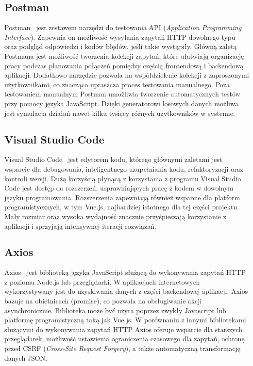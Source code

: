 \subsection{Postman}
Postman~\cite{postman} jest zestawem narzędzi do testowania API (\textit{Application Programming Interface}). Zapewnia on możliwość wysyłania zapytań HTTP dowolnego typu oraz podgląd odpowiedzi i kodów błędów, jeśli takie wystąpiły. Główną zaletą Postmana jest możliwość tworzenia kolekcji zapytań, które ułatwiają organizację pracy podczas planowania połączeń pomiędzy częścią frontendową i backendową aplikacji. Dodatkowo narzędzie pozwala na współdzielenie kolekcji z zaproszonymi użytkownikami, co znacząco upraszcza proces testowania manualnego. Poza testowaniem manualnym Postman umożliwia tworzenie automatycznych testów przy pomocy języka JavaScript. Dzięki generatorowi losowych danych możliwa jest symulacja działań nawet kilku tysięcy różnych użytkowników w systemie.
\subsection{Visual Studio Code}
Visual Studio Code~\cite{vscode} jest edytorem kodu, którego głównymi zaletami jest wsparcie dla debugowania, inteligentnego uzupełniania kodu, refaktoryzacji oraz kontroli wersji. Dużą korzyścią płynącą z korzystania z programu Visual Studio Code jest dostęp do rozszerzeń, usprawniających pracę z kodem w dowolnym języku programowania. Rozszerzenia zapewniają również wsparcie dla platform programistycznych, w tym Vue.js, najbardziej istotnego dla tej części projektu. Mały rozmiar oraz wysoka wydajność znacznie przyśpieszają korzystanie z aplikacji i sprzyjają intensywnej iteracji rozwiązań.
\subsection{Axios}
Axios~\cite{axios} jest biblioteką języka JavaScript służącą do wykonywania zapytań HTTP z poziomu Node.js lub przeglądarki. W aplikacjach internetowych wykorzystywany jest do uzyskiwania danych z części backendowej aplikacji. Axios bazuje na obietnicach (promise), co pozwala na obsługiwanie akcji asynchronicznie. Biblioteka może być użyta poprzez zwykły Javascript lub platformę programistyczną taką jak Vue.js. W porównaniu z innymi bibliotekami służącymi do wykonywania zapytań HTTP Axios oferuje wsparcie dla starszych przeglądarek, możliwość ustawienia ograniczenia czasowego dla zapytań, ochronę przed CSRF (\textit{Cross-Site Request Forgery}), a także automatyczną transformację danych JSON.
